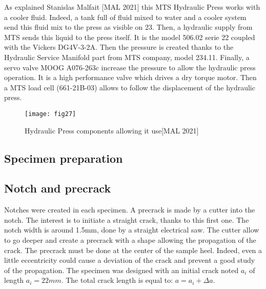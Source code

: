 As explained Stanislas Malfait [MAL 2021]  this MTS Hydraulic Press works with a cooler fluid. Indeed, a tank full of fluid mixed to water and a cooler system send this fluid mix to the press as visible on 23. Then, a hydraulic supply from MTS sends this liquid to the press itself. It is the model 506.02 serie 22 coupled with the Vickers DG4V-3-2A. Then the pressure is created thanks to the Hydraulic Service Manifold part from MTS company, model 234.11. Finally, a servo valve MOOG A076-263c increase the pressure to allow the hydraulic press operation. It is a high performance valve which drives a dry torque motor. Then a MTS load cell (661-21B-03) allows to follow the displacement of the hydraulic press.

\graphicspath{{Images/}}
\begin{figure}[htp]
	\centering
	\texttt{[image: fig27]}
	\caption{Hydraulic Press components allowing it use[MAL 2021]}
	\label{fig:fig27}
\end{figure}

\subsection{Specimen preparation}

\subsection{Notch and precrack}

Notches were created in each specimen. A precrack is made by a cutter into the notch. The interest is to initiate a straight crack, thanks to this first one. The notch width is around 1.5mm, done by a straight electrical saw. The cutter allow to go deeper and create a precrack with a shape allowing the propagation of the crack. The precrack must be done at the center of the sample heel. Indeed, even a little eccentricity could cause a deviation of the crack and prevent a good study of the propagation. The specimen was designed with an initial crack noted $a_i$ of length  $a_i=22mm$. The total crack length is equal to: $a=a_i+\Delta a$.